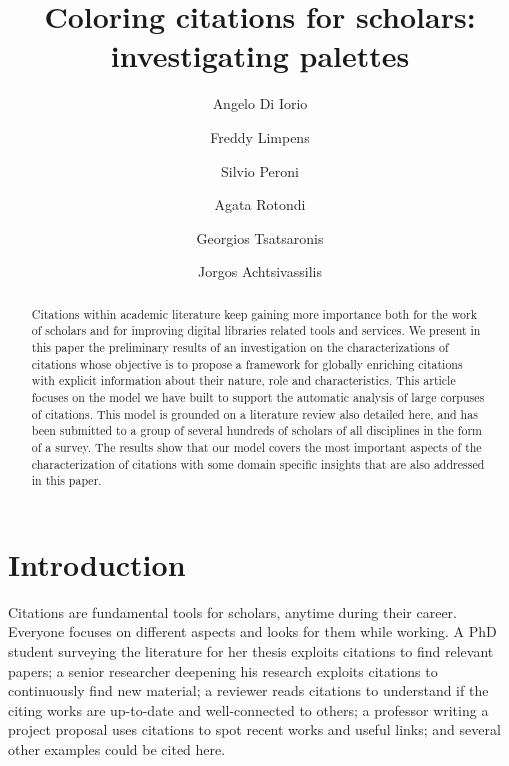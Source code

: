 \documentclass[runningheads,a4paper]{llncs}
\begin{document}
\mainmatter

\title{Coloring citations for scholars: investigating palettes}
\author{Angelo Di Iorio \and
Freddy Limpens \and
Silvio Peroni \and
Agata Rotondi \and
Georgios Tsatsaronis \and
Jorgos Achtsivassilis}
\maketitle

\begin{abstract}
Citations within academic literature keep gaining more importance both for the work of scholars and for improving digital libraries related tools and services. We present in this paper the preliminary results of an investigation on the characterizations of citations whose objective is to propose a framework for globally enriching citations with explicit information about their nature, role and characteristics. This article focuses on the model we have built to support the automatic analysis of large corpuses of citations. This model is grounded on a literature review also detailed here, and has been submitted to a group of several hundreds of scholars of all disciplines in the form of a survey. The results show that our model covers the most important aspects of the characterization of citations with some domain specific insights that are also addressed in this paper.

\end{abstract}

\section{Introduction}

Citations are fundamental tools for scholars, anytime during their career. Everyone focuses on different aspects and looks for them while working. A PhD student surveying the literature for her thesis exploits citations to find relevant papers; a senior researcher deepening his research exploits citations to continuously find new material; a reviewer reads citations to understand if the citing works are up-to-date and well-connected to others; a professor writing a project proposal uses citations to spot recent works and useful links; and several other examples could be cited here.
\end{document}
